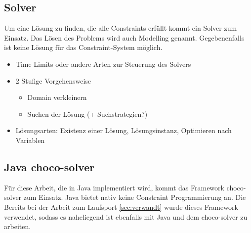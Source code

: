 \subsection{Solver}
Um eine Lösung zu finden, die alle Constraints erfüllt kommt ein Solver zum Einsatz. Das Lösen des Problems wird auch Modelling genannt. Gegebenenfalls ist keine Lösung für das Constraint-System möglich. 
\begin{itemize}
    \item Time Limits oder andere Arten zur Steuerung des Solvers
    \item 2 Stufige Vorgehensweise
    \begin{itemize}
        \item Domain verkleinern
        \item Suchen der Lösung (+ Suchstrategien?)
    \end{itemize}
    \item Lösungsarten: Existenz einer Lösung, Lösungsinstanz, Optimieren nach Variablen
\end{itemize}

\subsection{Java choco-solver}
Für diese Arbeit, die in Java \cite{arnold2005java} implementiert wird, kommt das Framework choco-solver \cite{ChocoSolverWeb} zum Einsatz. Java bietet nativ keine Constraint Programmierung an. Die Bereits bei der Arbeit zum Laufsport \ref{sec:verwandt} wurde dieses Framework verwendet, sodass es naheliegend ist ebenfalls mit Java und dem choco-solver zu arbeiten.